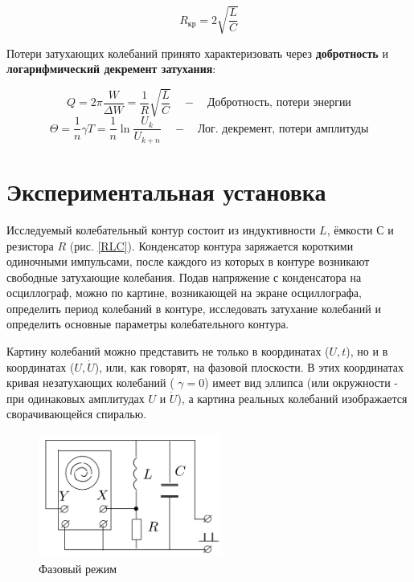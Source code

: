 \documentclass[12pt]{kiarticle} %
\begin{document}
\begin{equation}\label{}
R_{кр} = 2\sqrt{\dfrac{L}{C}}
\end{equation}

Потери затухающих колебаний принято характеризовать через \textbf{добротность} и \textbf{логарифмический декремент затухания}: 

\begin{equation}\label{Q}
Q = 2\pi \dfrac{W}{\Delta W} = \dfrac{1}{R} \sqrt{\dfrac{L}{C}} \quad - \quad \text{Добротность, потери энергии}
\end{equation}
\begin{equation}\label{theta}
\Theta = \dfrac{1}{n} \gamma T = \dfrac{1}{n} \ln \dfrac{U_k}{U_{k+n}}  \quad - \quad \text{Лог. декремент, потери амплитуды}
\end{equation}

\section{Экспериментальная установка}
Исследуемый колебательный контур состоит из индуктивности $ L $,
ёмкости $ С $ и резистора $ R $ (рис. \ref{RLC}). Конденсатор контура заряжается
короткими одиночными импульсами, после каждого из которых в контуре
возникают свободные затухающие колебания. Подав напряжение
с конденсатора на осциллограф, можно по картине, возникающей на
экране осциллографа, определить период колебаний в контуре, исследовать
затухание колебаний и определить основные параметры колебательного
контура.

Картину колебаний можно представить не только в координатах ($ U, t $), но и в координатах ($ U, \dot{U} $), или, как говорят, на фазовой
плоскости. В этих координатах кривая незатухающих колебаний ( $ \gamma = 0 $)
имеет вид эллипса (или окружности - при одинаковых амплитудах $ U $
и $ \dot{U} $), а картина реальных колебаний изображается сворачивающейся
спиралью. 


\begin{figure} 
	\includegraphics[width=6cm]{Fase}
	\caption{Фазовый режим}
	\label{Fase}
\end{figure}
\end{document}
